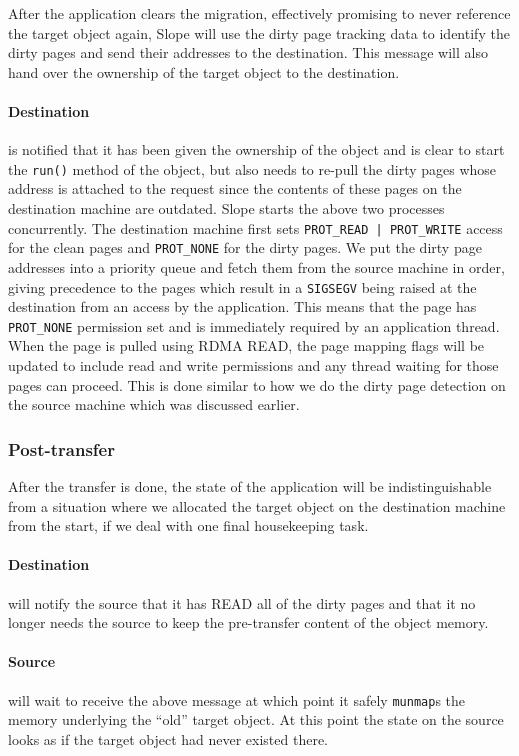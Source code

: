 After the application clears the migration, effectively promising to never
reference the target object again, Slope will use the dirty
page tracking data to identify the dirty pages and send their addresses
to the destination. This message will also hand over the ownership
of the target object to the destination.

\paragraph{Destination} is notified that it has been given the ownership of
the object and is clear to start the \texttt{run()} method of the object,
but also needs to re-pull the dirty pages whose address is attached to the
request since the contents of these pages on the destination machine are
outdated.
Slope starts the above two processes concurrently. The destination machine
first sets
\texttt{PROT\_READ | PROT\_WRITE} access for the clean pages and
\texttt{PROT\_NONE} for the dirty pages. We put the dirty page addresses into 
a priority queue and fetch them from the source machine in order, giving
precedence to the pages which result in a
\texttt{SIGSEGV} being raised at the destination from an access by the
application. This means that the page has \texttt{PROT\_NONE} permission set and
is immediately required by an application thread. When the page is pulled using
RDMA READ, the page mapping flags will be updated to include read and write
permissions and any thread waiting for those pages can proceed. This is done
similar to how we do the dirty page detection on the source machine which was
discussed earlier.

\subsubsection{Post-transfer}
After the transfer is done, the state of the application will be
indistinguishable from a situation where we allocated the target object on
the destination machine from the start, if we deal with one final housekeeping
task.

\paragraph{Destination} will notify the source that it has READ all of the
dirty pages and that it no longer needs the source to keep the
pre-transfer content of the object memory.

\paragraph{Source} will wait to receive the above message at which point it
safely \texttt{munmap}s the memory underlying the ``old'' target object. At
this point the state on the source looks as if the target object had never existed
there.


